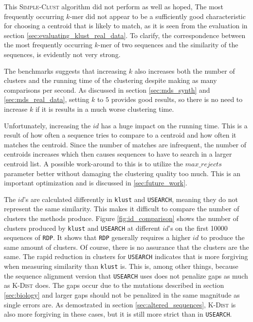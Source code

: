 This \textsc{Simple-Clust} algorithm did not perform as well as hoped, The most
frequently occurring $k$-mer did not appear to be a sufficiently good
characteristic for choosing a centroid that is likely to match, as it is seen
from the evaluation in section \ref{sec:evaluating_klust_real_data}. To
clarify, the correspondence between the most frequently occurring $k$-mer of
two sequences and the similarity of the sequences, is evidently not very
strong.

The benchmarks suggests that increasing $k$ also increases both the number
of clusters and the running time of the clustering despite making as many
comparisons per second. As discussed in section \ref{sec:mds_synth} and
\ref{sec:mds_real_data}, setting $k$ to $5$ provides good results, so there is
no need to increase $k$ if it is results in a much worse clustering time.

Unfortunately, increasing the $id$ has a huge impact on the running time. This
is a result of how often a sequence tries to compare to a centroid and how
often it matches the centroid. Since the number of matches are infrequent, the
number of centroids increases which then causes sequences to have to search in
a larger centroid list. A possible work-around to this is to utilize the $max\_
rejects$ parameter better without damaging the clustering quality too much.
This is an important optimization and is discussed in
\ref{sec:future_work}.

The $id$'s are calculated differently in \texttt{klust} and \texttt{USEARCH},
meaning they do not represent the same similarity. This makes it difficult to
compare the number of clusters the methods produce. Figure
\ref{fig:id_comparison} shows the number of clusters produced by
\texttt{klust} and \texttt{USEARCH} at different $id$'s on the first
\num{10000} sequences of \texttt{RDP}. It shows that \texttt{RDP} generally
requires a higher $id$ to produce the same amount of clusters. Of course,
there is no assurance that the clusters are the same. The rapid reduction in
clusters for \texttt{USEARCH} indicates that is more forgiving when measuring
similarity than \texttt{klust} is. This is, among other things, because the
sequence alignment version that \texttt{USEARCH} uses does not penalize gaps
as much as \textsc{K-Dist} does. The gaps occur due to the mutations described
in section \ref{sec:biology} and larger gaps should not be penalized in the
same magnitude as single errors are. As demostrated in section
\ref{sec:altered_sequences}, \textsc{K-Dist} is also more forgiving in these
cases, but it is still more strict than in \texttt{USEARCH}.

